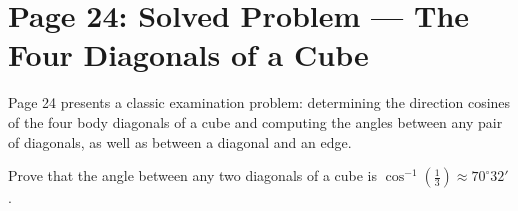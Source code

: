 \section{Page 24: Solved Problem --- The Four Diagonals of a Cube}
\label{sec:page24}

\begin{conceptbox}
Page 24 presents a classic examination problem: determining the direction cosines of the four body diagonals of a cube and computing the angles between any pair of diagonals, as well as between a diagonal and an edge.
\end{conceptbox}

\begin{examplebox}
Prove that the angle between any two diagonals of a cube is $\cos^{-1}\left(\frac{1}{3}\right) \approx 70^\circ 32'$.
\end{examplebox}


